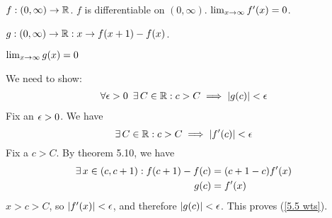 \documentclass[11pt,letterpaper]{article}
\begin{document}
\begin{Problem}{5.5}
\begin{Hypothesis}
$f : (0,\infty) \rightarrow \mathbb{R}$. $f$ is differentiable on $(0,\infty)$. $\lim_{x \rightarrow \infty}f'(x)=0$. 

$g:(0,\infty)\rightarrow\mathbb{R}:x\rightarrow f(x+1)-f(x)$. 
\end{Hypothesis}
\begin{Claim} $\lim_{x \rightarrow \infty}g(x)=0$ \end{Claim}
\begin{Proof}
We need to show:
\begin{align}\label{5.5 wts} \forall \epsilon>0 \,\,\,\exists\, C\in\mathbb{R} :c > C \implies |g(c)|<\epsilon \end{align}
Fix an $\epsilon>0$. We have
\[ \exists\, C\in\mathbb{R} :c>C\implies|f'(c)|<\epsilon \]
Fix a $c>C$. By theorem 5.10, we have
\begin{align*} 
\exists\, x\in(c,c+1) :f(c+1)-f(c) &= (c+1-c)f'(x) \\
g(c) &= f'(x)
\end{align*}
$x>c>C$, so $|f'(x)|<\epsilon$, and therefore $|g(c)|<\epsilon$. This proves (\ref{5.5 wts}).
\end{Proof}
\end{Problem}
\end{document}
